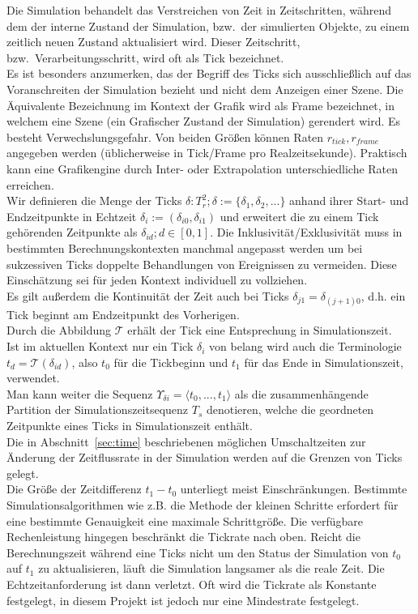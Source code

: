 
Die Simulation behandelt das Verstreichen von Zeit in Zeitschritten, während dem der interne Zustand der Simulation, bzw.~der simulierten Objekte, zu einem zeitlich neuen Zustand aktualisiert wird.
Dieser Zeitschritt, bzw.~Verarbeitungsschritt, wird oft als Tick bezeichnet.\\

Es ist besonders anzumerken, das der Begriff des Ticks sich ausschließlich auf das Voranschreiten der Simulation bezieht und nicht dem Anzeigen einer Szene. Die Äquivalente Bezeichnung im Kontext der Grafik wird als Frame bezeichnet, in welchem eine Szene (ein Grafischer Zustand der Simulation) gerendert wird. Es besteht Verwechslungsgefahr. Von beiden Größen können Raten $r_{tick}, r_{frame}$ angegeben werden (üblicherweise in Tick/Frame pro Realzeitsekunde). Praktisch kann eine Grafikengine durch Inter- oder Extrapolation unterschiedliche Raten erreichen.\\
Wir definieren die Menge der Ticks $\delta:T_r^2; \delta:=\{\delta_1, \delta_2, ...\}$ anhand ihrer Start- und Endzeitpunkte in Echtzeit $\delta_i := (\delta_{i0}, \delta_{i1})$ und erweitert die zu einem Tick gehörenden Zeitpunkte als $\delta_{id}; d \in [0,1]$. Die Inklusivität/Exklusivität muss in bestimmten Berechnungskontexten manchmal angepasst werden um bei sukzessiven Ticks doppelte Behandlungen von Ereignissen zu vermeiden. Diese Einschätzung sei für jeden Kontext individuell zu vollziehen.\\
Es gilt außerdem die Kontinuität der Zeit auch bei Ticks $\delta_{j1} = \delta_{(j+1)0}$, d.h. ein Tick beginnt am Endzeitpunkt des Vorherigen.\\
Durch die Abbildung $\mathcal{T}$ erhält der Tick eine Entsprechung in Simulationszeit.\\
Ist im aktuellen Kontext nur ein Tick $\delta_i$ von belang wird auch die Terminologie $t_d =\mathcal{T}(\delta_{id})$, also $t_0$ für die Tickbeginn und $t_1$ für das Ende in Simulationszeit, verwendet.\\
Man kann weiter die Sequenz $\Upsilon_{\delta i} = \langle t_0, ...,  t_1\rangle$ als die zusammenhängende Partition der Simulationszeitsequenz $T_s$ denotieren, welche die geordneten Zeitpunkte eines Ticks in Simulationszeit enthält.\\
Die in Abschnitt~\ref{sec:time} beschriebenen möglichen Umschaltzeiten zur Änderung der Zeitflussrate in der Simulation werden auf die Grenzen von Ticks gelegt.\\
Die Größe der Zeitdifferenz $t_1 - t_0$ unterliegt meist Einschränkungen. Bestimmte Simulationsalgorithmen wie z.B. die Methode der kleinen Schritte erfordert für eine bestimmte Genauigkeit eine maximale Schrittgröße. Die verfügbare Rechenleistung hingegen beschränkt die Tickrate nach oben. Reicht die Berechnungszeit während eine Ticks nicht um den Status der Simulation von $t_0$ auf $t_1$ zu aktualisieren, läuft die Simulation langsamer als die reale Zeit. Die Echtzeitanforderung ist dann verletzt. Oft wird die Tickrate als Konstante festgelegt, in diesem Projekt ist jedoch nur eine Mindestrate festgelegt.
